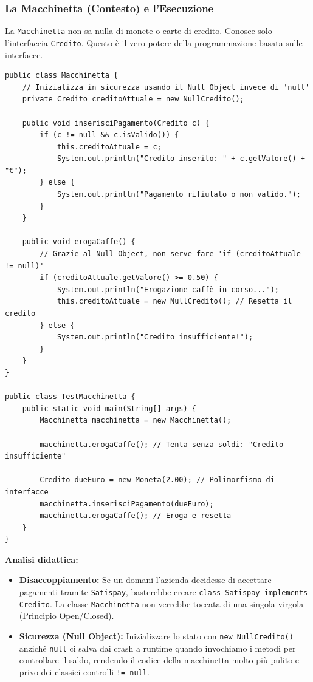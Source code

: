 \documentclass[12pt, a4paper]{article}
\begin{document}
\newpage

\subsubsection{La Macchinetta (Contesto) e l'Esecuzione}
La \texttt{Macchinetta} non sa nulla di monete o carte di credito. Conosce solo l'interfaccia \texttt{Credito}. Questo è il vero potere della programmazione basata sulle interfacce.

\begin{verbatim}
public class Macchinetta {
    // Inizializza in sicurezza usando il Null Object invece di 'null'
    private Credito creditoAttuale = new NullCredito(); 
    
    public void inserisciPagamento(Credito c) {
        if (c != null && c.isValido()) {
            this.creditoAttuale = c;
            System.out.println("Credito inserito: " + c.getValore() + "€");
        } else {
            System.out.println("Pagamento rifiutato o non valido.");
        }
    }
    
    public void erogaCaffe() {
        // Grazie al Null Object, non serve fare 'if (creditoAttuale != null)'
        if (creditoAttuale.getValore() >= 0.50) {
            System.out.println("Erogazione caffè in corso...");
            this.creditoAttuale = new NullCredito(); // Resetta il credito
        } else {
            System.out.println("Credito insufficiente!");
        }
    }
}

public class TestMacchinetta {
    public static void main(String[] args) {
        Macchinetta macchinetta = new Macchinetta();
        
        macchinetta.erogaCaffe(); // Tenta senza soldi: "Credito insufficiente"
        
        Credito dueEuro = new Moneta(2.00); // Polimorfismo di interfacce
        macchinetta.inserisciPagamento(dueEuro);
        macchinetta.erogaCaffe(); // Eroga e resetta
    }
}
\end{verbatim}

\textbf{Analisi didattica:}
\begin{itemize}
    \item \textbf{Disaccoppiamento:} Se un domani l'azienda decidesse di accettare pagamenti tramite \texttt{Satispay}, basterebbe creare \texttt{class Satispay implements Credito}. La classe \texttt{Macchinetta} non verrebbe toccata di una singola virgola (Principio Open/Closed).
    \item \textbf{Sicurezza (Null Object):} Inizializzare lo stato con \texttt{new NullCredito()} anziché \texttt{null} ci salva dai crash a runtime quando invochiamo i metodi per controllare il saldo, rendendo il codice della macchinetta molto più pulito e privo dei classici controlli \texttt{!= null}.
\end{itemize}
\end{document}
